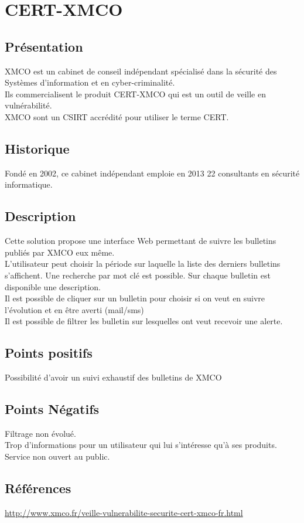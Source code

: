 \section{CERT-XMCO}
\thispagestyle{plain}
\subsection{Présentation}
XMCO est un cabinet de conseil indépendant spécialisé dans la sécurité des Systèmes d’information et en cyber-criminalité.\\
Ils commercialisent le produit CERT-XMCO qui est un outil de veille en vulnérabilité.\\
XMCO sont un CSIRT accrédité pour utiliser le terme CERT.\\

\subsection{Historique}
Fondé en 2002, ce cabinet indépendant emploie en 2013 22 consultants en sécurité informatique.

\subsection{Description}
Cette solution propose une interface Web permettant de suivre les bulletins publiés par XMCO eux même.\\
L’utilisateur peut choisir la période sur laquelle la liste des derniers bulletins s’affichent. Une recherche par mot clé est possible. Sur chaque bulletin est disponible une description.\\
Il est possible de cliquer sur un bulletin pour choisir si on veut en suivre l’évolution et en être averti (mail/sms)\\
Il est possible de filtrer les bulletin sur lesquelles ont veut recevoir une alerte.\\

\subsection{Points positifs}
Possibilité d’avoir un suivi exhaustif des bulletins de XMCO

\subsection{Points Négatifs}
Filtrage non évolué.\\
Trop d’informations pour un utilisateur qui lui s’intéresse qu’à ses produits.\\
Service non ouvert au public.\\

\subsection{Références}
\small
\noindent
\url{http://www.xmco.fr/veille-vulnerabilite-securite-cert-xmco-fr.html}
\normalsize